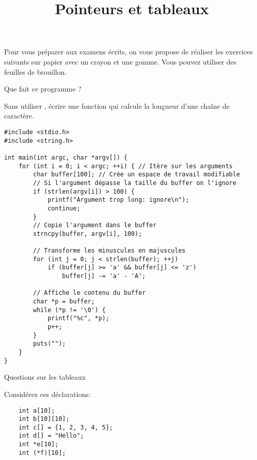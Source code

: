 \documentclass[french,a4paper,addpoints,11pt]{exam}
\title{Pointeurs et tableaux}
\begin{document}
\maketitle
\thispagestyle{headandfoot}

Pour vous préparer aux examens écrits, on vous propose de réaliser les exercices suivants sur papier avec un crayon et une gomme. Vous pouvez utiliser des feuilles de brouillon.

\begin{questions}

\question Que fait ce programme ?

\begin{solutionordottedlines}[6cm]

\end{solutionordottedlines}

\question Sans utiliser , écrire une fonction qui calcule la longueur d'une chaîne de caractère.

\begin{solutionordottedlines}[5cm]
\begin{lstlisting}
#include <stdio.h>
#include <string.h>

int main(int argc, char *argv[]) {
    for (int i = 0; i < argc; ++i) { // Itère sur les arguments
        char buffer[100]; // Crée un espace de travail modifiable
        // Si l'argument dépasse la taille du buffer on l'ignore
        if (strlen(argv[i]) > 100) {
            printf("Argument trop long: ignore\n");
            continue;
        }
        // Copie l'argument dans le buffer
        strncpy(buffer, argv[i], 100);

        // Transforme les minuscules en majuscules
        for (int j = 0; j < strlen(buffer); ++j)
            if (buffer[j] >= 'a' && buffer[j] <= 'z')
                buffer[j] -= 'a' - 'A';

        // Affiche le contenu du buffer
        char *p = buffer;
        while (*p != '\0') {
            printf("%c", *p);
            p++;
        }
        puts("");
    }
}
\end{lstlisting}
\end{solutionordottedlines}

\question Questions sur les tableaux

Considérez ces déclarations:

\begin{lstlisting}
    int a[10];
    int b[10][10];
    int c[] = {1, 2, 3, 4, 5};
    int d[] = "Hello";
    int *e[10];
    int (*f)[10];
\end{lstlisting}


\end{questions}
\end{document}
